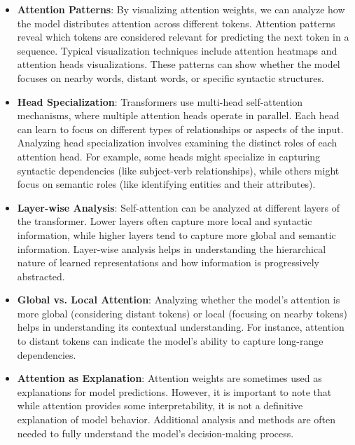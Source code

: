 \begin{itemize}
    \item \textbf{Attention Patterns}: By visualizing attention weights, we can analyze how the model distributes attention across different tokens. Attention patterns reveal which tokens are considered relevant for predicting the next token in a sequence. Typical visualization techniques include attention heatmaps and attention heads visualizations. These patterns can show whether the model focuses on nearby words, distant words, or specific syntactic structures.
    
    \item \textbf{Head Specialization}: Transformers use multi-head self-attention mechanisms, where multiple attention heads operate in parallel. Each head can learn to focus on different types of relationships or aspects of the input. Analyzing head specialization involves examining the distinct roles of each attention head. For example, some heads might specialize in capturing syntactic dependencies (like subject-verb relationships), while others might focus on semantic roles (like identifying entities and their attributes).

    \item \textbf{Layer-wise Analysis}: Self-attention can be analyzed at different layers of the transformer. Lower layers often capture more local and syntactic information, while higher layers tend to capture more global and semantic information. Layer-wise analysis helps in understanding the hierarchical nature of learned representations and how information is progressively abstracted.
    
    \item \textbf{Global vs. Local Attention}: Analyzing whether the model's attention is more global (considering distant tokens) or local (focusing on nearby tokens) helps in understanding its contextual understanding. For instance, attention to distant tokens can indicate the model's ability to capture long-range dependencies.

    \item \textbf{Attention as Explanation}: Attention weights are sometimes used as explanations for model predictions. However, it is important to note that while attention provides some interpretability, it is not a definitive explanation of model behavior. Additional analysis and methods are often needed to fully understand the model's decision-making process.
    
\end{itemize}

